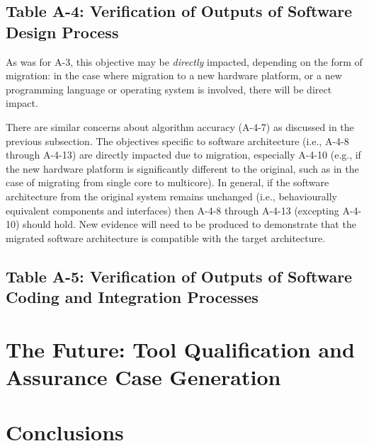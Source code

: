 \documentclass{llncs}
\begin{document}
\subsection{Table A-4: Verification of Outputs of Software Design Process}
As was for A-3, this objective may be \textit{directly} impacted, depending on the form of migration: in the case where migration to a new hardware platform, or a new programming language or operating system is involved, there will be direct impact. 

There are similar concerns about algorithm accuracy (A-4-7) as discussed in the previous subsection. The objectives specific to software architecture (i.e., A-4-8 through A-4-13) are directly impacted due to migration, especially A-4-10 (e.g., if the new hardware platform is significantly different to the original, such as in the case of migrating from single core to multicore). In general, if the software architecture from the original system remains unchanged (i.e., behaviourally equivalent components and interfaces) then A-4-8 through A-4-13 (excepting A-4-10) should hold. New evidence will need to be produced to demonstrate that the migrated software architecture is compatible with the target architecture.

\subsection{Table A-5: Verification of Outputs of Software Coding and Integration Processes}



\section{The Future: Tool Qualification and Assurance Case Generation}

\section{Conclusions}



\renewcommand{\baselinestretch}{1.0}
\end{document}

